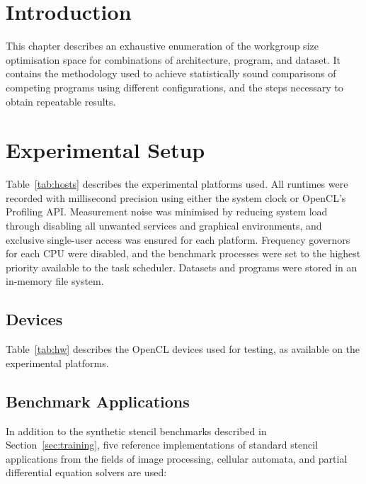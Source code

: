 \section{Introduction}

This chapter describes an exhaustive enumeration of the workgroup size
optimisation space for  combinations of
architecture, program, and dataset. It contains the methodology used
to achieve statistically sound comparisons of competing programs using
different configurations, and the steps necessary to obtain repeatable
results.


\section{Experimental Setup}

\begin{table}

\caption{%
  Specification of experimental platforms.%
}
\label{tab:hosts}
\end{table}

Table~\ref{tab:hosts} describes the experimental platforms used.  All
runtimes were recorded with millisecond precision using either the
system clock or OpenCL's Profiling API. Measurement noise was
minimised by reducing system load through disabling all unwanted
services and graphical environments, and exclusive single-user access
was ensured for each platform. Frequency governors for each CPU were
disabled, and the benchmark processes were set to the highest priority
available to the task scheduler. Datasets and programs were stored in
an in-memory file system.

\subsection{Devices}

\begin{table}

\caption{%
  Specification of experimental OpenCL devices.%
}
\label{tab:hw}
\end{table}

Table~\ref{tab:hw} describes the OpenCL devices used for testing, as
available on the experimental platforms.

\subsection{Benchmark Applications}

In addition to the synthetic stencil benchmarks described in
Section~\ref{sec:training}, five reference implementations of standard
stencil applications from the fields of image processing, cellular
automata, and partial differential equation solvers are used:

